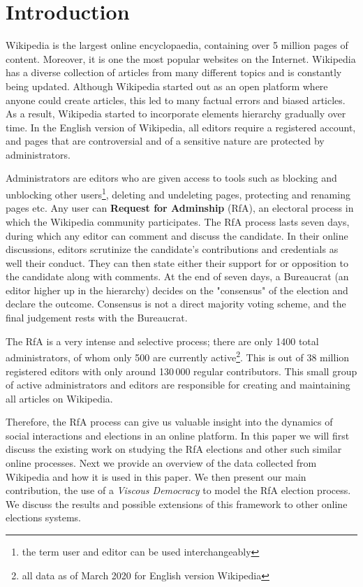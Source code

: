 \section{Introduction}
\label{sec:introduction}

Wikipedia is the largest online encyclopaedia, containing over 5 million pages of content. Moreover, it is one the most popular websites on the Internet. Wikipedia has a diverse collection of articles from many different topics and is constantly being updated. Although Wikipedia started out as an open platform where anyone could create articles, this led to many factual errors and biased articles. As a result, Wikipedia started to incorporate elements hierarchy gradually over time. In the English version of Wikipedia, all editors require a registered account, and pages that are controversial and of a sensitive nature are protected by administrators.

Administrators are editors who are given access to tools such as blocking and unblocking other users\footnote{the term user and editor can be used interchangeably}, deleting and undeleting pages, protecting and renaming pages etc. Any user can \textbf{Request for Adminship} (RfA), an electoral process in which the Wikipedia community participates. The RfA process lasts seven days, during which any editor can comment and discuss the candidate. In their online discussions, editors scrutinize the candidate's contributions and credentials as well their conduct. They can then state either their support for or opposition to the candidate along with comments. At the end of seven days, a Bureaucrat (an editor higher up in the hierarchy) decides on the "consensus" of the election and declare the outcome. Consensus is not a direct majority voting scheme, and the final judgement rests with the Bureaucrat.

The RfA is a very intense and selective process; there are only 1400 total administrators, of whom only 500 are currently active\footnote{all data as of March 2020 for English version Wikipedia}. This is out of 38 million registered editors with only around 130\,000 regular contributors. This small group of active administrators and editors are responsible for creating and maintaining all articles on Wikipedia.

Therefore, the RfA process can give us valuable insight into the dynamics of social interactions and elections in an online platform. In this paper we will first discuss the existing work on studying the RfA elections and other such similar online processes. Next we provide an overview of the data collected from Wikipedia and how it is used in this paper. We then present our main contribution, the use of a \textit{Viscous Democracy} to model the RfA election process. We discuss the results and possible extensions of this framework to other online elections systems.  
